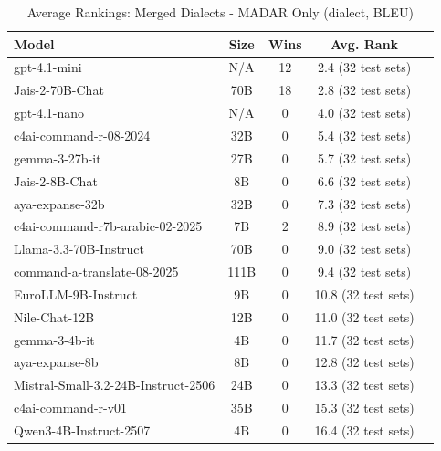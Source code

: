 \begin{table}[htbp]
\centering
\caption{Average Rankings: Merged Dialects - MADAR Only (dialect, BLEU)}
\label{tab:avg_rankings_bleu_dialect}
\begin{tabular}{l@{\hspace{3pt}}c@{\hspace{3pt}}c@{\hspace{3pt}}c@{\hspace{3pt}}c}
\toprule
Model & Size & Wins & Avg. Rank \\
\midrule
gpt-4.1-mini & N/A & 12 & 2.4 (32 test sets) \\
Jais-2-70B-Chat & 70B & 18 & 2.8 (32 test sets) \\
gpt-4.1-nano & N/A & 0 & 4.0 (32 test sets) \\
c4ai-command-r-08-2024 & 32B & 0 & 5.4 (32 test sets) \\
gemma-3-27b-it & 27B & 0 & 5.7 (32 test sets) \\
Jais-2-8B-Chat & 8B & 0 & 6.6 (32 test sets) \\
aya-expanse-32b & 32B & 0 & 7.3 (32 test sets) \\
c4ai-command-r7b-arabic-02-2025 & 7B & 2 & 8.9 (32 test sets) \\
Llama-3.3-70B-Instruct & 70B & 0 & 9.0 (32 test sets) \\
command-a-translate-08-2025 & 111B & 0 & 9.4 (32 test sets) \\
EuroLLM-9B-Instruct & 9B & 0 & 10.8 (32 test sets) \\
Nile-Chat-12B & 12B & 0 & 11.0 (32 test sets) \\
gemma-3-4b-it & 4B & 0 & 11.7 (32 test sets) \\
aya-expanse-8b & 8B & 0 & 12.8 (32 test sets) \\
Mistral-Small-3.2-24B-Instruct-2506 & 24B & 0 & 13.3 (32 test sets) \\
c4ai-command-r-v01 & 35B & 0 & 15.3 (32 test sets) \\
Qwen3-4B-Instruct-2507 & 4B & 0 & 16.4 (32 test sets) \\
\bottomrule
\end{tabular}
\end{table}